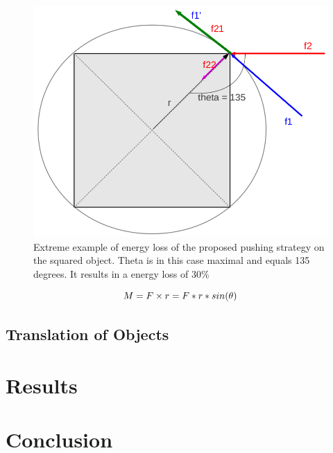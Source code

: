 \begin{figure}
 

\includegraphics[width=1\columnwidth]{figures/square-angle.png}


\caption{Extreme example of energy loss of the proposed pushing strategy on the squared object. Theta is in this case maximal and equals 135 degrees. It results in a energy loss of 30\%  }
\label{fig:angles}
\end{figure}


\begin{equation}
M =  F \times r = F*r*sin(\theta)\\
\end{equation}



\subsection{Translation of Objects}






\section{Results}
\section{Conclusion}